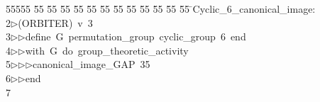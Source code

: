 %
%
\begin{tabbing}
55555 \= 55 \= 55 \= 55 \= 55 \= 55 \= 55 \= 55 \= 55 \= 55 \= 55 \= 55 \= 55 \= \>Cyclic\_6\_canonical\_image:\\[0pt]
2\>$\triangleright$\>(ORBITER)\ v\ 3\ \\[0pt]
3\>$\triangleright$\>$\triangleright$\>define\ G\ permutation\_group\ cyclic\_group\ 6\ end\ \\[0pt]
4\>$\triangleright$\>$\triangleright$\>with\ G\ do\ group\_theoretic\_activity\ \\[0pt]
5\>$\triangleright$\>$\triangleright$\>$\triangleright$\>canonical\_image\_GAP\ 35\ \\[0pt]
6\>$\triangleright$\>$\triangleright$\>end\\[0pt]
7\>\end{tabbing}
